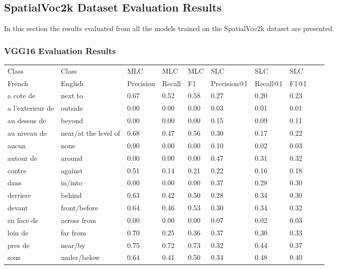 \documentclass{csfyp}
\begin{document}
\subsection{SpatialVoc2k Dataset Evaluation Results}
In this section the results evaluated from all the models trained on the SpatialVoc2k dataset are presented.

\subsubsection{VGG16 Evaluation Results}
\begin{table}[!htbp]
\centering
\begin{tabular}{|l|l|l|l|l|l|l|l|l|l}
\cline{1-8}
Class & Class & MLC  &  MLC  &  MLC & SLC &  SLC & SLC \\ \cline{1-8}
French & English & Precision &  Recall    & F1 & Precision@1 & Recall@1 & F1@1 \\ \cline{1-8}
a cote de	      &	next to	&	0.67	&	0.52	&	0.58	&	0.27	&	0.20	&	0.23 \\ \cline{1-8}
a l'exterieur de  &	outside	&	0.00	&	0.00	&	0.00	&	0.03	&	0.01	&	0.01 \\ \cline{1-8}
au dessus de	  &	beyond	&	0.00	&	0.00	&	0.00	&	0.15	&	0.09	&	0.11 \\ \cline{1-8}
au niveau de	  &	near/at the level of	&	0.68	&	0.47	&	0.56	&	0.30	&	0.17	&	0.22 \\ \cline{1-8}
aucun	          &	 none	&	0.00	&	0.00	&	0.00	&	0.10	&	0.02	&	0.03 \\ \cline{1-8} 
autour de	&	around	&	0.00	&	0.00	&	0.00	&	0.47	&	0.31	&	0.32 \\ \cline{1-8}
contre	&	against	&	0.51	&	0.14	&	0.21	&	0.22	&	0.16	&	0.18 \\ \cline{1-8}
dans	&	in/into	&	0.00	&	0.00	&	0.00	&	0.37	&	0.28	&	0.30 \\ \cline{1-8}
derriere	&	behind	&	0.63	&	0.42	&	0.50	&	0.28	&	0.34	&	0.30 \\ \cline{1-8}
devant	&	front/before	&	0.64	&	0.46	&	0.53	&	0.30	&	0.34	&	0.32 \\ \cline{1-8} 
en face de	&	across from	&	0.00	&	0.00	&	0.00	&	0.07	&	0.02	&	0.03 \\ \cline{1-8} 
loin de	&	far from	&	0.70	&	0.25	&	0.36	&	0.37	&	0.30	&	0.33 \\ \cline{1-8}
pres de	&	near/by	&	0.75	&	0.72	&	0.73	&	0.32	&	0.44	&	0.37 \\ \cline{1-8}
sous	&	under/below	&	0.64	&	0.41	&	0.50	&	0.34	&	0.48	&	0.40 \\ \cline{1-8}

\end{tabular}
\end{table}
\end{document}
